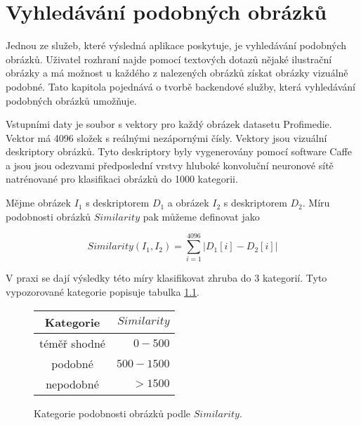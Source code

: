\chapter{Vyhledávání podobných obrázků}

Jednou ze služeb, které výsledná aplikace poskytuje, je vyhledávání podobných obrázků. Uživatel rozhraní najde pomocí textových dotazů nějaké ilustrační obrázky a má možnost u každého z nalezených obrázků získat obrázky vizuálně podobné. Tato kapitola pojednává o tvorbě backendové služby, která vyhledávání podobných obrázků umožňuje.

Vstupními daty je soubor s vektory pro každý obrázek datasetu Profimedie. Vektor má 4096 složek s reálnými nezápornými čísly. Vektory jsou vizuální deskriptory obrázků. Tyto deskriptory byly vygenerovány pomocí software Caffe a jsou jsou odezvami předposlední vrstvy hluboké konvoluční neuronové sítě natrénované pro klasifikaci obrázků do 1000 kategorii.

Mějme obrázek $I_1$ s deskriptorem $D_1$ a obrázek $I_2$ s deskriptorem $D_2$. Míru podobnosti obrázků $Similarity$ pak můžeme definovat jako

\begin{equation}
  Similarity(I_1, I_2) = \sum_{i=1}^{4096} |D_1[i]-D_2[i]|
\end{equation}

V praxi se dají výsledky této míry klasifikovat zhruba do 3 kategorií. Tyto vypozorované kategorie popisuje tabulka \ref{fig:simtypes}.

\begin{figure}
\label{fig:simtypes}
\centering
\begin{tabular}{ | c | r |}
  \hline
     Kategorie & $Similarity$\\
  \hline
  \hline
    téměř shodné & $0 - 500$ \\
  \hline
    podobné & $500 - 1500$ \\
  \hline
    nepodobné & $> 1500$ \\
\hline
\end{tabular}

  \caption{Kategorie podobnosti obrázků podle $Similarity$.}
\end{figure}

